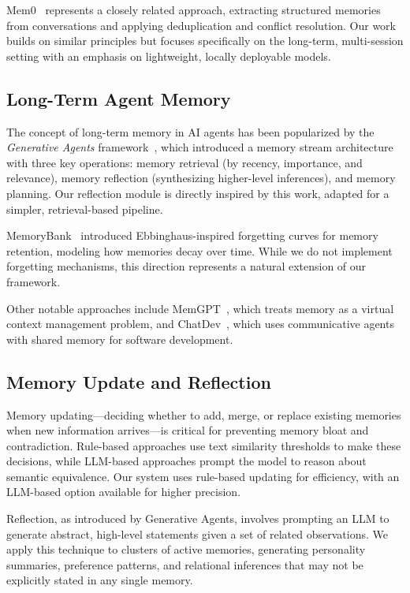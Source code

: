 \documentclass[11pt]{article}
\begin{document}
Mem0~\cite{mem0} represents a closely related approach, extracting structured memories from conversations and applying deduplication and conflict resolution. Our work builds on similar principles but focuses specifically on the long-term, multi-session setting with an emphasis on lightweight, locally deployable models.

\subsection{Long-Term Agent Memory}

The concept of long-term memory in AI agents has been popularized by the \textit{Generative Agents} framework~\cite{park2023generative}, which introduced a memory stream architecture with three key operations: memory retrieval (by recency, importance, and relevance), memory reflection (synthesizing higher-level inferences), and memory planning. Our reflection module is directly inspired by this work, adapted for a simpler, retrieval-based pipeline.

MemoryBank~\cite{zhong2023memorybank} introduced Ebbinghaus-inspired forgetting curves for memory retention, modeling how memories decay over time. While we do not implement forgetting mechanisms, this direction represents a natural extension of our framework.

Other notable approaches include MemGPT~\cite{packer2023memgpt}, which treats memory as a virtual context management problem, and ChatDev~\cite{qian2024chatdev}, which uses communicative agents with shared memory for software development.

\subsection{Memory Update and Reflection}

Memory updating---deciding whether to add, merge, or replace existing memories when new information arrives---is critical for preventing memory bloat and contradiction. Rule-based approaches use text similarity thresholds to make these decisions, while LLM-based approaches prompt the model to reason about semantic equivalence. Our system uses rule-based updating for efficiency, with an LLM-based option available for higher precision.

Reflection, as introduced by Generative Agents, involves prompting an LLM to generate abstract, high-level statements given a set of related observations. We apply this technique to clusters of active memories, generating personality summaries, preference patterns, and relational inferences that may not be explicitly stated in any single memory.
\end{document}
